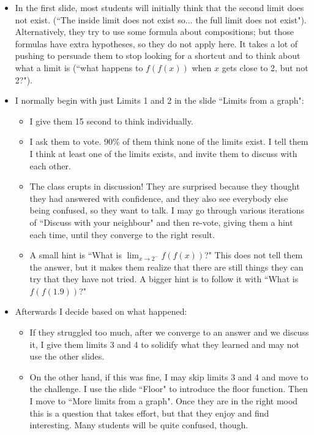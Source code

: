 \documentclass[11pt]{article}
\newcommand {\DS} [1] {${\displaystyle #1}$}
\begin{document}
\begin{comments}
\begin{itemize}
		\item  In the first slide, most students will initially think that the second limit does not exist.  (``The inside limit does not exist so... the full limit does not exist").  Alternatively, they try to use some formula about compositions; but those formulas have extra hypotheses, so they do not apply here.
 It takes a lot of pushing to persuade them to stop looking for a shortcut and to think about what a limit is (``what happens to $f(f(x))$ when $x$ gets close to 2, but not 2?").
 		\item  I normally begin with just Limits 1 and 2 in the slide ``Limits from a graph":
			\begin{itemize}
				\item I give them 15 second to think individually.
				\item I ask them to vote.  90\% of them think none of the limits exist.  I tell them I think at least one of the limits exists, and invite them to discuss with each other.
				\item  The class erupts in discussion!  They are surprised because they thought they had answered with confidence, and they also see everybody else being confused, so they want to talk.  I may go through various iterations of ``Discuss with your neighbour" and then re-vote, giving them a hint each time, until they converge to the right result.
				\item A small hint is ``What is \DS{\lim_{x\to 2^-}f(f(x))}?"  This does not tell them the answer, but it makes them realize that there are still things they can try that they have not tried.  A bigger hint is to follow it with ``What is $f(f(1.9))$?"
			\end{itemize}
		\item Afterwards I decide based on what happened:
			\begin{itemize}
				\item  If they struggled too much, after we converge to an answer and we discuss it, I give them limits 3 and 4 to solidify what they learned and may not use the other slides.
				\item On the other hand, if this was fine, I may skip limits 3 and 4 and move to the challenge.   I use the slide ``Floor" to introduce the floor function.  Then I move to ``More limits from a graph".   Once they are in the right mood this is a question that takes effort, but that they enjoy and find interesting.  Many students will be quite confused, though.
			\end{itemize}
 	\end{itemize}
\end{comments}
\end{document}

